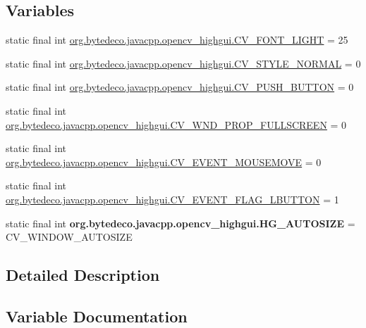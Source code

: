 \subsection*{Variables}
\begin{DoxyCompactItemize}
\item 
static final int \hyperlink{group__highgui__c_ga997b89fc958011c83e9b4cc4d4ad4325}{org.\+bytedeco.\+javacpp.\+opencv\+\_\+highgui.\+C\+V\+\_\+\+F\+O\+N\+T\+\_\+\+L\+I\+G\+HT} = 25
\item 
static final int \hyperlink{group__highgui__c_ga56cd33d4cb9f9b515efedaead4248259}{org.\+bytedeco.\+javacpp.\+opencv\+\_\+highgui.\+C\+V\+\_\+\+S\+T\+Y\+L\+E\+\_\+\+N\+O\+R\+M\+AL} = 0
\item 
static final int \hyperlink{group__highgui__c_ga4a134d3b4944f55e83c58bc64ad00a74}{org.\+bytedeco.\+javacpp.\+opencv\+\_\+highgui.\+C\+V\+\_\+\+P\+U\+S\+H\+\_\+\+B\+U\+T\+T\+ON} = 0
\item 
static final int \hyperlink{group__highgui__c_ga831b812c11a02daadd9eb33d3254e2a1}{org.\+bytedeco.\+javacpp.\+opencv\+\_\+highgui.\+C\+V\+\_\+\+W\+N\+D\+\_\+\+P\+R\+O\+P\+\_\+\+F\+U\+L\+L\+S\+C\+R\+E\+EN} = 0
\item 
static final int \hyperlink{group__highgui__c_gaacb100056c747de1e17b2c216dc0c495}{org.\+bytedeco.\+javacpp.\+opencv\+\_\+highgui.\+C\+V\+\_\+\+E\+V\+E\+N\+T\+\_\+\+M\+O\+U\+S\+E\+M\+O\+VE} = 0
\item 
static final int \hyperlink{group__highgui__c_ga1d9ec028c68ce5bc18849288ec24ae36}{org.\+bytedeco.\+javacpp.\+opencv\+\_\+highgui.\+C\+V\+\_\+\+E\+V\+E\+N\+T\+\_\+\+F\+L\+A\+G\+\_\+\+L\+B\+U\+T\+T\+ON} = 1
\item 
\mbox{\label{group__highgui__c_ga6c1a1aad4310ddf5a5fc852037ddaf35}} 
static final int {\bfseries org.\+bytedeco.\+javacpp.\+opencv\+\_\+highgui.\+H\+G\+\_\+\+A\+U\+T\+O\+S\+I\+ZE} = C\+V\+\_\+\+W\+I\+N\+D\+O\+W\+\_\+\+A\+U\+T\+O\+S\+I\+ZE
\end{DoxyCompactItemize}


\subsection{Detailed Description}


\subsection{Variable Documentation}
\mbox{\label{group__highgui__c_ga1d9ec028c68ce5bc18849288ec24ae36}} 
